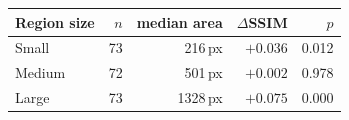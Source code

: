 \begin{tabular}{lrrrr}
\toprule
Region size & $n$ & median area & $\Delta$SSIM & $p$ \\
\midrule
Small & 73 & 216\,px & $+0.036$ & 0.012 \\
Medium & 72 & 501\,px & $+0.002$ & 0.978 \\
Large & 73 & 1328\,px & $+0.075$ & 0.000 \\
\bottomrule
\end{tabular}